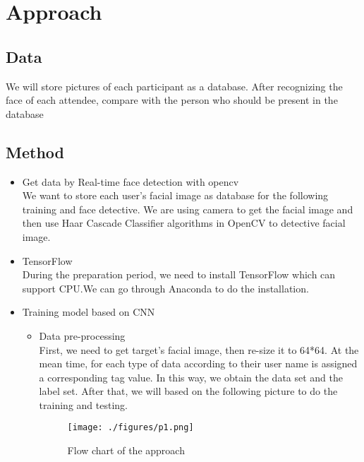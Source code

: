 \documentclass[conference]{IEEEtran}
\begin{document}
    

\section{Approach}
\subsection{Data}
We will store pictures of each participant as a database. 
After recognizing the face of each attendee, compare with the person who should be present in the database
\subsection{Method}
\begin{itemize}
\item Get data by Real-time face detection with opencv\\
We want to store each user's facial image as database for the following training and face detective. We are using camera to get the facial image and then use Haar Cascade Classifier algorithms in OpenCV to detective facial image.


\item TensorFlow\\
During the preparation period, we need to install TensorFlow which can support CPU.We can go through Anaconda to do the installation.

\item  Training model based on CNN
\begin{itemize}
\item Data pre-processing
\\First, we need to get target's facial image, then re-size it to 64*64. At the mean time, for each type of data according to their user name is assigned a corresponding tag value. In this way, we obtain the data set and the label set. After that, we will based on the following picture to do the  training and testing.

\begin{figure}[htbp]
\centerline{\texttt{[image: ./figures/p1.png]}}
\label{fig}
\caption{Flow chart of the approach}
\end{figure}


\end{itemize}
\end{itemize}
\end{document}
